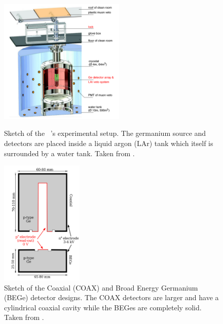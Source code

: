 \documentclass[encoding=utf8,british]{tumphthesis}
\begin{document}
\begin{figure}[t!]
	\centering
	\begin{minipage}[t!]{.45\textwidth}
		\centering
		\includegraphics[height=60mm]{./Bilder/GERDAsetupPhaseII.png}
		\caption{Sketch of the \gerda\ \PII's experimental setup. The germanium source and detectors are placed inside a liquid argon (LAr) tank which itself is surrounded by a water tank. Taken from \cite{collaboration_upgrade_2018}.}
		\label{fig:gerdaSetupPII}
	\end{minipage}\hfill%
	\begin{minipage}[t!]{.45\textwidth}
		\centering
		\includegraphics[height=60mm]{./Bilder/DetectorDesign.png}
		\caption{Sketch of the Coaxial (COAX) and Broad Energy Germanium (BEGe) detector designs. The COAX detectors are larger and have a cylindrical coaxial cavity while the BEGes are completely solid. Taken from \cite{agostini_background_2014}.}
		\label{fig:DetcDes}
	\end{minipage}
\end{figure}
\end{document}

